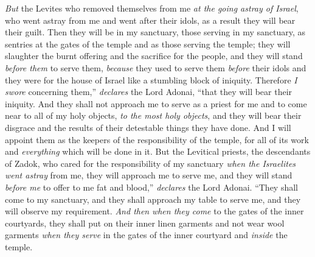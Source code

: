 \begin{biblechapter}
\verse \textit{But} the Levites who removed themselves from me \textit{at the going astray of Israel}, who went astray from me and went after their idols, as a result they will bear their guilt.
\verse Then they will be in my sanctuary, those serving in my sanctuary, as sentries at the gates of the temple and as those serving the temple; they will slaughter the burnt offering and the sacrifice for the people, and they will stand \textit{before them} to serve them,
\verse \textit{because} they used to serve them \textit{before} their idols and they were for the house of Israel like a stumbling block of iniquity. Therefore \textit{I swore} concerning them,” \textit{declares} the Lord Adonai, “that they will bear their iniquity.
\verse And they shall not approach me to serve as a priest for me and to come near to all of my holy objects, \textit{to the most holy objects},  and they will bear their disgrace and the results of their detestable things they have done.
\verse And I will appoint them as the keepers of the responsibility of the temple, for all of its work and \textit{everything} which will be done in it.
\verse But the Levitical priests, the descendants of Zadok, who cared for the responsibility of my sanctuary \textit{when the Israelites went astray} from me, they will approach me to serve me, and they will stand \textit{before me} to offer to me fat and blood,” \textit{declares} the Lord Adonai.
\verse “They shall come to my sanctuary, and they shall approach my table to serve me, and they will observe my requirement.
\verse \textit{And then} \textit{when they come} to the gates of the inner courtyards, they shall put on their inner linen garments and not wear wool garments \textit{when they serve} in the gates of the inner courtyard and \textit{inside} the temple.

\end{biblechapter}
